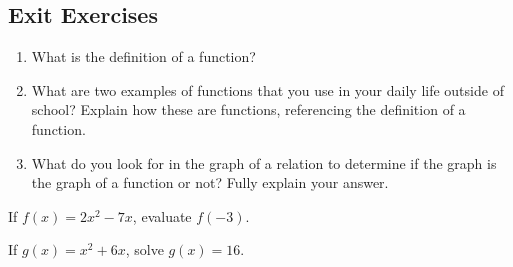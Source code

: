 \begin{myDefinition}
\begin{minipage}{0.5\linewidth}
\begin{center}
				\label{fig:fan-def2}
			\end{center}
		\end{minipage}
\end{myDefinition}






 \newpage

\subsection*{Exit Exercises} \label{exit-functions-and-notation}


\begin{myExit}
	\begin{enumerate}
		\item What is the definition of a function?  
		\vfill
		\item What are two examples of functions that you use in your daily life outside of school?  Explain how these are functions, referencing the definition of a function.
		\vfill
		\vfill
		\item What do you look for in the graph of a relation to determine if the graph is the graph of a function or not?  Fully explain your answer.
		\vfill
		\end{enumerate}
\end{myExit}

	\begin{multicols}{2}
\begin{myExit}
If $f(x) = 2x^2-7x$, evaluate $f(-3)$.
\end{myExit}
\begin{myExit}
If $g(x) = x^2+6x$, solve $g(x)=16$.
\end{myExit}
	\end{multicols}
		\vfill
		\vfill
		\vfill










